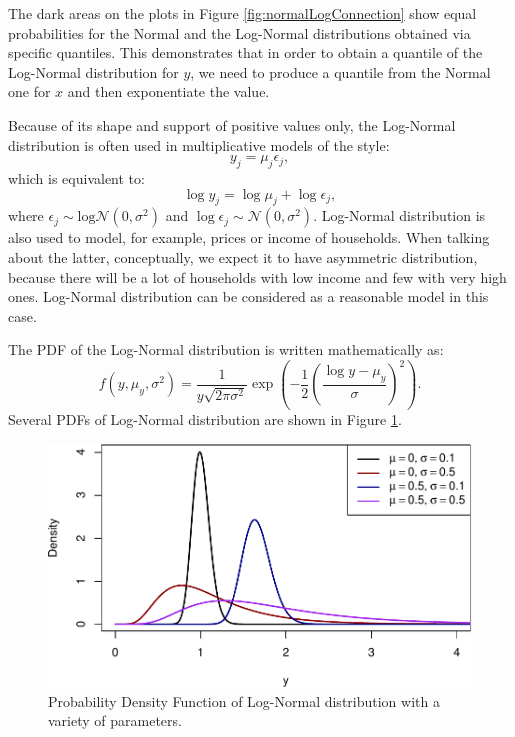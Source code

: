 \documentclass[
]{book}
\theoremstyle{definition}
\theoremstyle{definition}
\theoremstyle{definition}
\theoremstyle{definition}
\theoremstyle{remark}
\begin{document}
The dark areas on the plots in Figure \ref{fig:normalLogConnection} show equal probabilities for the Normal and the Log-Normal distributions obtained via specific quantiles. This demonstrates that in order to obtain a quantile of the Log-Normal distribution for \(y\), we need to produce a quantile from the Normal one for \(x\) and then exponentiate the value.

Because of its shape and support of positive values only, the Log-Normal distribution is often used in multiplicative models of the style:
\begin{equation}
    y_j = \mu_j \epsilon_j ,
    \label{eq:LogNormalModel}
\end{equation}
which is equivalent to:
\begin{equation}
    \log y_j = \log \mu_j + \log \epsilon_j ,
    \label{eq:LogNormalModelLogs}
\end{equation}
where \(\epsilon_j \sim \mathrm{log}\mathcal{N}(0, \sigma^2)\) and \(\log \epsilon_j \sim \mathcal{N}(0, \sigma^2)\). Log-Normal distribution is also used to model, for example, prices or income of households. When talking about the latter, conceptually, we expect it to have asymmetric distribution, because there will be a lot of households with low income and few with very high ones. Log-Normal distribution can be considered as a reasonable model in this case.

The PDF of the Log-Normal distribution is written mathematically as:
\begin{equation}
    f(y, \mu_y, \sigma^2) = \frac{1}{y \sqrt{2 \pi \sigma^2}} \exp \left( -\frac{1}{2} \left(\frac{\log y - \mu_y}{\sigma}\right)^2 \right) .
    \label{eq:LogNormalPDF}
\end{equation}
Several PDFs of Log-Normal distribution are shown in Figure \ref{fig:dlnormPlot}.

\begin{figure}
\centering
\includegraphics{Svetunkov---Statistics-for-Business-Analytics_files/figure-latex/dlnormPlot-1.pdf}
\caption{\label{fig:dlnormPlot}Probability Density Function of Log-Normal distribution with a variety of parameters.}
\end{figure}
\end{document}
